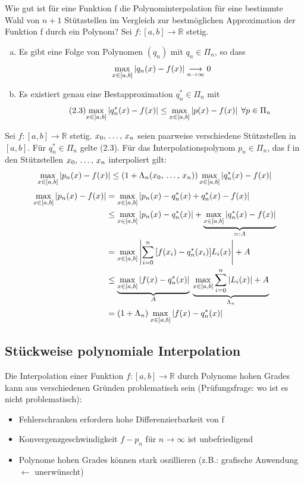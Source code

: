 Wie gut ist für eine Funktion f die Polynominterpolation für eine bestimmte Wahl
von $n + 1$ Stützstellen im Vergleich zur bestmöglichen Approximation der Funktion f
durch ein Polynom?
 Sei $f:[a, b] \longrightarrow \mathbb{R}$ stetig.
\begin{enumerate}[(a)]
  \item Es gibt eine Folge von Polynomen $(q_n)$ mit $q_n \in \Pi_n$, so dass
    \begin{equation*}
      \underset{x \in [a, b]}{\max} \left| q_n(x) - f(x) \right| \underset{n \to \infty}{\longrightarrow} 0
    \end{equation*}
  \item Es existiert genau eine Bestapproximation $q_n^* \in \Pi_n$ mit
    \begin{equation}
      \tag{2.3}
      \underset{x \in [a, b]}{\max} \left| q_n^*(x) - f(x) \right| \leq \underset{x \in [a, b]}{\max} \left| p(x) - f(x) \right| \; \forall p \in \Pi_n
    \end{equation}
\end{enumerate}
 Sei $f:[a, b] \longrightarrow \mathbb{R}$ stetig. $x_0,\,\ldots,\,x_n$
seien paarweise verschiedene Stützstellen in $[a, b]$. Für $q_n^* \in \Pi_n$ gelte
(2.3). Für das Interpolationspolynom $p_n \in \Pi_n$, das f in den Stützstellen
$x_0,\,\ldots,\,x_n$ interpoliert gilt:
\begin{equation*}
  \underset{x \in [a, b]}{\max} \left| p_n(x) - f(x) \right| \leq (1 + \Lambda_n(x_0,\,\ldots,\,x_n))\,\underset{x \in [a, b]}{\max} \left| q_n^*(x) - f(x) \right|
\end{equation*}
\begin{align*}
  \underset{x \in [a, b]}{\max} \left| p_n(x) - f(x) \right| &= \underset{x \in [a, b]}{\max} \left| p_n(x) - q_n^*(x) + q_n^*(x) - f(x) \right|\\
  &\leq \underset{x \in [a, b]}{\max} \left| p_n(x) - q_n^*(x) \right| + \underbrace{\underset{x \in [a, b]}{\max} \left| q_n^*(x) - f(x) \right|}_{=:A}\\
  &= \underset{x \in [a, b]}{\max} \left| \sum\limits_{i=0}^{n}{[}f(x_i) - q_n^*(x_i)]L_i(x) \right| + A\\
  &\leq \underbrace{\underset{x \in [a, b]}{\max} \left| f(x) - q_n^*(x) \right|}_A \: \underbrace{ \underset{x \in [a, b]}{\max} \sum\limits_{i=0}^{n}{\left|  L_{i}(x)  \right|} + A}_{\Lambda_n} \\
  &= (1 + \Lambda_n) \: \underset{x \in [a, b]}{\max} \left| f(x) - q_n^*(x) \right|
\end{align*}

\subsection{Stückweise polynomiale Interpolation}
Die Interpolation einer Funktion $f:[a,b] \longrightarrow \mathbb{R}$ durch Polynome hohen Grades
kann aus verschiedenen Gründen problematisch sein (Prüfungsfrage: wo ist es nicht problematisch):
\begin{itemize}
  \item Fehlerschranken erfordern hohe Differenzierbarkeit von f
  \item Konvergenzgeschwindigkeit $f-p_n$ für $n \rightarrow \infty$ ist unbefriedigend
  \item Polynome hohen Grades können stark oszillieren (z.B.: grafische Anwendung $\leftarrow$ unerwünscht)
\end{itemize}


